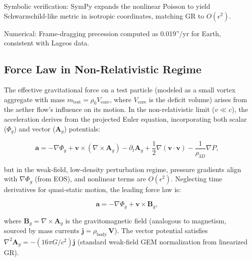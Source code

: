 Symbolic verification: SymPy expands the nonlinear Poisson to yield Schwarzschild-like metric in isotropic coordinates, matching GR to $O(\epsilon^2)$.

Numerical: Frame-dragging precession computed as 0.019''/yr for Earth, consistent with Lageos data.

\medskip
\noindent
{}
\medskip

\subsection{Force Law in Non-Relativistic Regime}

The effective gravitational force on a test particle (modeled as a small vortex aggregate with mass $m_{\text{test}} = \rho_0 V_{\text{core}}$, where $V_{\text{core}}$ is the deficit volume) arises from the aether flow's influence on its motion. In the non-relativistic limit ($v \ll c$), the acceleration derives from the projected Euler equation, incorporating both scalar ($\Phi_g$) and vector ($\mathbf{A}_g$) potentials:

\[
\mathbf{a} = -\nabla \Phi_g + \mathbf{v} \times (\nabla \times \mathbf{A}_g) - \partial_t \mathbf{A}_g + \frac{1}{2} \nabla (\mathbf{v} \cdot \mathbf{v}) - \frac{1}{\rho_{3D}} \nabla P,
\]

but in the weak-field, low-density perturbation regime, pressure gradients align with $\nabla \Phi_g$ (from EOS), and nonlinear terms are $O(\epsilon^2)$. Neglecting time derivatives for quasi-static motion, the leading force law is:

\[
\mathbf{a} = -\nabla \Phi_g + \mathbf{v} \times \mathbf{B}_g,
\]

where $\mathbf{B}_g = \nabla \times \mathbf{A}_g$ is the gravitomagnetic field (analogous to magnetism, sourced by mass currents $\mathbf{j} = \rho_{\text{body}} \, \mathbf{V}$). The vector potential satisfies $\nabla^2 \mathbf{A}_g = - (16\pi G / c^2) \mathbf{j}$ (standard weak-field GEM normalization from linearized GR).

